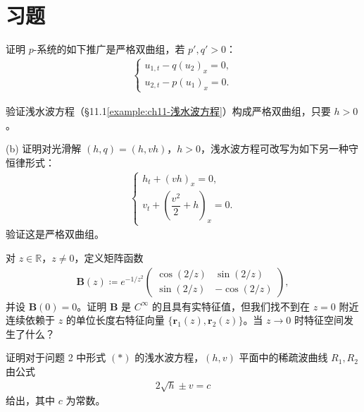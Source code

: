 \documentclass[../../main.tex]{subfiles}
\begin{document}
\section{习题}\label{section:ch11-习题}

\begin{exercise}\label{exercise:ch11-1}
证明 $p$-系统的如下推广是严格双曲组，若 $p',q'>0$：
\begin{align*}
\begin{cases}
u_{1,t}-q(u_2)_x=0,\\
u_{2,t}-p(u_1)_x=0.
\end{cases}
\end{align*}
\end{exercise}

\begin{exercise}[a]\label{exercise:ch11-2} 验证浅水波方程（\S11.1\cref{example:ch11-浅水波方程}）构成严格双曲组，只要 $h>0$。

(b) 证明对光滑解 $(h,q)=(h,vh)$，$h>0$，浅水波方程可改写为如下另一种守恒律形式：
\begin{align}
\begin{cases}
h_t+(vh)_x=0,\\
v_t+\left(\dfrac{v^2}{2}+h\right)_x=0.
\end{cases}
\label{align:ch11-浅水交替形式}
\end{align}
验证这是严格双曲组。
\end{exercise}

\begin{exercise}\label{exercise:ch11-3}
对 $z\in\mathbb{R}$，$z\neq 0$，定义矩阵函数
\begin{align*}
\mathbf{B}(z)\coloneqq e^{-1/z^2}\begin{pmatrix}\cos(2/z) & \sin(2/z)\\ \sin(2/z) & -\cos(2/z)\end{pmatrix},
\end{align*}
并设 $\mathbf{B}(0)=0$。证明 $\mathbf{B}$ 是 $C^\infty$ 的且具有实特征值，但我们找不到在 $z=0$ 附近连续依赖于 $z$ 的单位长度右特征向量 $\{\mathbf{r}_1(z),\mathbf{r}_2(z)\}$。当 $z\to 0$ 时特征空间发生了什么？
\end{exercise}

\begin{exercise}[稀疏波曲线。]\label{exercise:ch11-4}证明对于问题 2 中形式 $(*)$ 的浅水波方程，$(h,v)$ 平面中的稀疏波曲线 $R_1,R_2$ 由公式
\begin{align*}
2\sqrt{h}\pm v=c
\end{align*}
给出，其中 $c$ 为常数。
\end{exercise}
\end{document}
